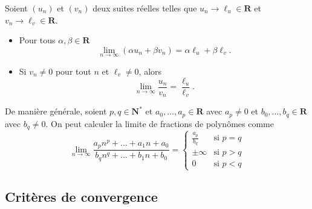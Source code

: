 
\begin{corollary}
Soient $(u_{n})$ et $(v_{n})$ deux suites réelles telles que $u_{n}\to \ell _{u}\in \mathbf{R}$ et $v_{n}\to \ell _{v}\in \mathbf{R}$.
\begin{itemize}
\item Pour tous $\alpha,\beta \in \mathbf{R}$
$$
\lim_{ n \to \infty } (\alpha u_{n}+\beta v_{n})=\alpha \ell _{u}+\beta \ell _{v}.
$$
\item Si $v_{n}\neq 0$ pour tout $n$ et $\ell _{v}\neq 0$, alors
$$
\lim_{ n \to \infty } \frac{u_{n}}{v_{n}}=\frac{\ell_{u}}{\ell _{v}}.
$$
\end{itemize}
\end{corollary}

De manière générale, soient $p,q\in \mathbf{N}^{*}$ et $a_{0},\dots,a_{p}\in \mathbf{R}$ avec $a_{p}\neq 0$ et $b_{0},\dots,b_{q}\in \mathbf{R}$ avec $b_{q}\neq 0$. On peut calculer la limite de fractions de polynômes comme
$$
\lim_{ n \to \infty } \frac{a_{p}n^{p}+\dots +a_{1}n+a_{0}}{b_{q}n^{q}+\dots +b_{1}n+b_{0}}=\begin{cases} \frac{a_{p}}{b_{q}} & \text{si }p=q \\
\pm \infty &  \text{si }p>q  \\
0 & \text{si }p<q
\end{cases}
$$
\subsection{Critères de convergence}

